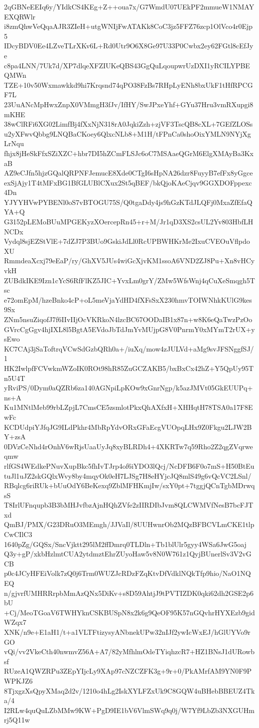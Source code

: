 2qGBNeEEIq6y/YIdkCS4KEg+Z++oua7x/G7WmdU07UEkPF2mmueW1NMAYEXQRWlr
i8zmQhwVeQqaAJR3ZIeH+utgWNIjFwATAKk8CoC3jz5FFZ76zcp1OlVco4r0Ejp5
IDcyBDV0Ee4LZveTLrXKv6L+Rd0Utr9O6X8Ge97U33P0Cwbx2ey62FGtl8cEfJye
c8pa4LNN/7Uk7d/XP7dlqeXFZIUKeQBS43GgQuLqoupwrUzDXI1yRCILYPBEQMWn
TZE+10v50Wxmawkkd9hi7Krqsnd74qPO38FzBs7RHpLyENh8bxUkF1tHfRPCGF7L
23UuANcMpHwxZnpX0VMmgH3fJv/IfHY/SwJPxeYhf+GYu37Hru3vmRXupgi8mKHE
38wClRFi6XG02LimfBj4fXxNjN318rA0JqkiZzh+zjVF3TscQB8cXL+7GEfZLOSs
u2yXFwvQbbg9LNQBaCKoey6QlxcNLb8+M1H/tFPnCa0shoOixYMLN9NYjXgLrNqu
fhjx8jHeSkFfxSZiXZC+hbr7DI5hZCmFLSJc6oC7MSAaeQGrM6ElgXMAyBa3KxaB
AZ9eCJfn5hjzGQalQRPNFJemucE8Xde0CTgI6sHpNA26dzr8FuyyB7efFx8yGgce
exSjAjy1T4tMFxBG1BfGLUBlCXux2St5qBEF/bkQjoKAeCjqv9GGXDOFppexc4Dn
YJYYHVwPYBENl0oS7vBTOGU75S/Q0tgaDdy4js9hGzKTdJLQFj0MxaZfEfaQYA+Q
G3152pLEMoBUuMPGEKyzXOercepRn45+r+M/Jr1qD3XS2csUL2Yv803HbfLHNCDx
Vydql8sjEZStVlE+7dZJ7P3BUo9GskiJdLl0RcUPBWHKrMe2IxuCVEOuVflpdoXU
RmmdeaXcxj79eEaP/ry/GhXV5JUs4wiGcXjvKM1ssoA6VND2ZJ8Pu+Xn8vHCyvkH
ZUBdkIKE9Izn1cYcS6RfFlKZ5JIC+YvxLm0grY/ZMw5WfsWnj4qCuXeSmqgh5Tsc
e72omEpM/hzeBnko4cP+oL5meVjaYdHD4fXFsSxX230hmvTOIWNhkKUlG9kes9Sx
ZNm5nsuZiqofJ7f6IIvIIjOcVKRkoN4lzcBC67OODaIB1x87n+w8K6eQaTwzPzOo
GVrcCgGgv4hjIXL8l5BgtA5EVdoJbTdJmYvMUjpG8V0PnrmY0xMYmT2rUX+ysEwo
KC7CAj3jSaToftrqVCwSdGzbQRh0a+/iuXq/mow4zJULVd+aMg9svJFSNggfSJ/1
HK2IwlpfFCVwkmWZoIK0ROt98hR85ZuGCZAKB5/bxBxCx42hZ+Y5QpUy95Tn5U4T
yRviPS/0Dym0aQZRb6za140AGNpiLpKOw9xGnrNgp/k5azJMVt05GkEUUPq+ns+A
Ku1MNtlMeb99rbLZpjL7CmsCE5zsmlotPkxQhAXfxH+XHHqtH78TSA0a17F8EwFc
KCDUdpiYJfqJG9ILdPkhr4MbRpYdvORxGFaEcgVUOpqLHx9Z0Fkgu2LJW2BY+zsA
0DVzCeNhd4rOnhV6wRjsUaaUyJq8xyBLRDh4+4XKRTw7q59Rho2Z2qgZVqrweqmw
rlfGS4WEdkePNuvXupBkc5fhIvTJrp4of6iYDO3lQcj/NcDFB6F0o7mS+H50BtEu
tuJl1uJZ2skGQlxWvy8by4mqyOk0eH7LJSg7H8eHYjcJQ8mlS49g6vQcVC2LSnl/
RBqlcg6riRUk+bUuOdY6BeKexq9ZblMFHKmjIw/sxY0pt+7tggjQCnTgbMDrwqsS
T8IrlUFnqupb3B3bMHJvfbzAjnHQhZVfe2zIIRDIbJvm8QLCWMVfNesB7bcFJTxd
QmBJ/PMX/G23DRuO3MEmgh/JJVaIl/8UUHwnrOb2MQzBFBCVLmCKE1tlpCwCIlC3
1640pZg/GQSx/SncVjktt295lM2ffDmrq0TLDln+Tb1blUlr5gyy4WSa6JwG5oaj
Q3y+gP/xkbHzlmtCUA2ytdmztEhrZUyoHaw5v8N0W761z1QyjBUnerlSv3V2vGCB
p0c4JCyHFEiVolk7zQ0j6Trm0WUZJcRDzFZqKtvDfVdklNQkTfp9hio/NaO1NQEQ
n/gjvrfUMHRRrpbMmAzQNx5DiKv+s8D59AhtjJ9tPVTIZDK0qki62dh2GSE2p6bU
+Cj/MeoTGoaV6TWHYknCSKBUSpN8x2k6g9QeOF95K57nGQvhrHYXEzb9gidWZqx7
XNK/n9e+E1aH1/t+a1VLTFtizysyANbnekUPw32nIJf2ywIcWxEJ/hGlUYVo9rGO
vQi/vv2VkeCth40nwmvZ56A+A7/82yMfhlmOdeTYiqhzcR7+HZ1BNsJ1dURowbsf
RUzeA1QWZRPu3ZEpYIjcLy9XAp97cNZCZFK3g+9r+0/PkAMrfAM9YN0F9PWPKJZ6
8TjxgzXsQpyXMaq2d2v/1210o4hLg2IskXYLFZxUk9C8GQW4uBHebBBEUZ4Tka/4
I2RLw4quQuLZbMMw9KW+PgD9IE1bV6VlmSWq9q0j/W7Yf9LbZb3NXGUHmrj5Q11w
